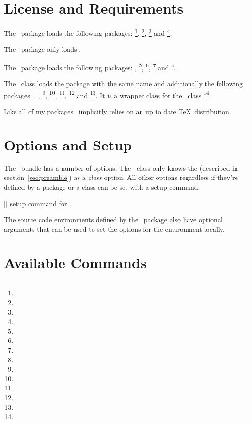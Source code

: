 \documentclass[load-preamble]{cnltx-doc}
\begin{document}
\section{License and Requirements}\label{sec:license}
\license

The \cnltxbase\ package loads the following packages:
\footnote{},
\footnote{},
\footnote{} and
\footnote{}.

The \cnltxcsnames\ package only loads \cnltxbase.

The \cnltxexample\ package loads the following packages:
\cnltxbase, \footnote{},
\footnote{},
\footnote{} and
\footnote{}.

The \cnltxdoc\ class loads the package with the same name and additionally
the following packages: \cnltxbase, \cnltxexample,
\footnote{},
\footnote{},
\footnote{},
\footnote{} and
\footnote{}. It is a wrapper class for the
\KOMAScript\ class \footnote{}.

Like all of my packages \cnltx\ implicitly relies on an up to date \TeX\
distribution.

\section{Options and Setup}
The \cnltx\ bundle has a number of options.  The \cnltxdoc\ class only knows
the \option{load-preamble} (described in section~\ref{sec:preamble}) as a
\emph{class} option.  All other options regardless if they're defined by a
package or a class can be set with a setup command:
\begin{commands}
  []
    setup command for \cnltx.
\end{commands}
The source code environments defined by the \cnltxexample\ package also have
optional arguments that can be used to set the options for the environment
locally.

\section{Available Commands}
\end{document}

